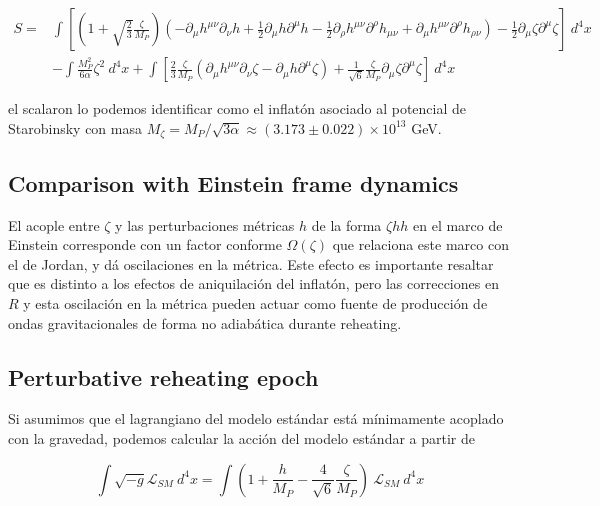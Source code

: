 \begin{equation}
    \begin{split}
        S =& \int \left[ \left( 1 + \sqrt{\frac{2}{3}} \frac{\zeta}{M_P} \right) \left( - \partial_\mu h^{\mu \nu} \partial_\nu h + \frac{1}{2} \partial_\mu h \partial^\mu h - \frac{1}{2} \partial_\rho h^{\mu \nu} \partial^\rho h_{\mu \nu} + \partial_\mu h^{\mu \nu} \partial^\rho h_{\rho \nu} \right) - \frac{1}{2} \partial_\mu \zeta \partial^\mu \zeta \right] ~ d^4 x\\
        &- \int \frac{M_P^2}{6 \alpha} \zeta^2 ~ d^4 x + \int \left[ \frac{2}{3} \frac{\zeta}{M_P} \left( \partial_\mu h^{\mu \nu} \partial_\nu \zeta - \partial_\mu h \partial^\mu \zeta \right) + \frac{1}{\sqrt{6}} \frac{\zeta}{M_P} \partial_\mu \zeta \partial^\mu \zeta \right] ~ d^4 x
    \end{split}
\end{equation}

\noindent
el scalaron lo podemos identificar como el inflatón asociado al potencial de Starobinsky con masa $M_\zeta = M_P/\sqrt{3 \alpha} \approx (3.173 \pm 0.022) \times 10^{13}$ GeV.

\subsection{Comparison with Einstein frame dynamics}

El acople entre $\zeta$ y las perturbaciones métricas $h$ de la forma $\zeta h h$ en el marco de Einstein corresponde con un factor conforme $\Omega (\zeta)$ que relaciona este marco con el de Jordan, y dá oscilaciones en la métrica. Este efecto es importante resaltar que es distinto a los efectos de aniquilación del inflatón, pero las correcciones en $R$ y esta oscilación en la métrica pueden actuar como fuente de producción de ondas gravitacionales de forma no adiabática durante reheating.

\subsection{Perturbative reheating epoch}

Si asumimos que el lagrangiano del modelo estándar está mínimamente acoplado con la gravedad, podemos calcular la acción del modelo estándar a partir de 

\begin{equation}
    \int \sqrt{-g} \mathcal{L}_{SM} ~ d^4 x = \int \left( 1 + \frac{h}{M_P} - \frac{4}{\sqrt{6}} \frac{\zeta}{M_P} \right) ~ \mathcal{L}_{SM} ~ d^4 x
\end{equation}

